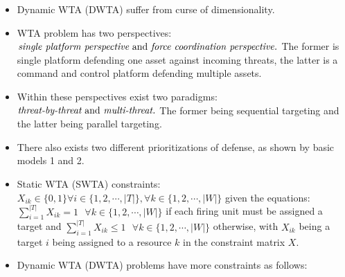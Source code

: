 \documentclass[12pt]{article} %
\renewcommand\le{\leqslant}
\renewcommand\ge{\geqslant}
\begin{document}
\begin{itemize}
\item Dynamic WTA (DWTA) suffer from curse of dimensionality.
\item WTA problem has two perspectives: $\textit{single platform perspective} \text{ and }\\\textit{force coordination perspective.}$ The former is single platform defending one asset against incoming threats, the latter is a command and control platform defending multiple assets.
\item Within these perspectives exist two paradigms: $\textit{threat-by-threat} \text{ and }\\\textit{multi-threat.}$ The former being sequential targeting and the latter being parallel targeting.
\item There also exists two different prioritizations of defense, as shown by basic models 1 and 2.
\item Static WTA (SWTA) constraints: $X_{ik} \in \{0, 1\} \forall i\in\{1, 2, \cdots, |T|\},\forall k\in\{1, 2, \cdots, |W|\}$ given the equations: $\sum_{i = 1}^{|T|}X_{ik} = 1 \ \ \ \forall k\in\{1, 2, \cdots, |W|\}$ if each firing unit must be assigned a target and $\sum_{i = 1}^{|T|}X_{ik} \le 1 \ \ \ \forall k\in\{1, 2, \cdots, |W|\}$ otherwise, with $X_{ik}$ being a target $i$ being assigned to a resource $k$ in the constraint matrix $X$. \\
\item Dynamic WTA (DWTA) problems have more constraints as follows:
\vspace{-0.5cm}
\begin{center}
\end{center}
\end{itemize}
\end{document}
